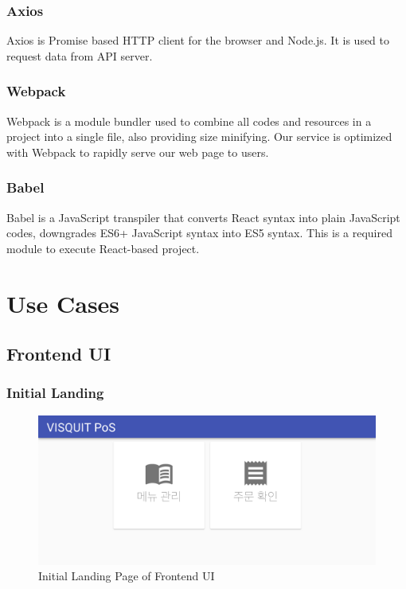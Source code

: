 \documentclass[conference,compsoc]{IEEEtran}
\begin{document}
\subsubsection{Axios}
Axios is Promise based HTTP client for the browser and Node.js. It is used to request data from API server.

\subsubsection{Webpack}
Webpack is a module bundler used to combine all codes and resources in a project into a single file, also providing size minifying. Our service is optimized with Webpack to rapidly serve our web page to users.

\subsubsection{Babel}
Babel is a JavaScript transpiler that converts React syntax into plain JavaScript codes, downgrades ES6+ JavaScript syntax into ES5 syntax. This is a required module to execute React-based project.

\section{Use Cases}

\subsection{Frontend UI}

\subsubsection{Initial Landing}

\begin{figure}[h!]
  \includegraphics[width=\linewidth]{figures/frontend/01-landing.png}
  \caption{Initial Landing Page of Frontend UI}
  \label{fig:01-landing}
\end{figure}
\end{document}

